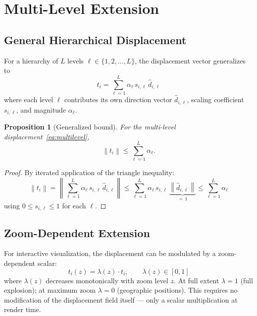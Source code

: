 \documentclass[12pt, a4paper]{article}
\numberwithin{equation}{section}
\theoremstyle{definition}
\theoremstyle{plain}
\newtheorem{proposition}{Proposition}[section]
\theoremstyle{remark}
\newcommand{\norm}[1]{\left\|#1\right\|}
\begin{document}
\section{Multi-Level Extension}
\label{sec:multilevel}

\subsection{General Hierarchical Displacement}

For a hierarchy of $L$ levels $\ell \in \{1, 2, \ldots, L\}$, the displacement vector generalizes to
\begin{equation}
  t_i = \sum_{\ell=1}^{L} \alpha_\ell\, s_{i,\ell}\, \hat{d}_{i,\ell}
  \label{eq:multilevel}
\end{equation}
where each level $\ell$ contributes its own direction vector $\hat{d}_{i,\ell}$, scaling coefficient $s_{i,\ell}$, and magnitude $\alpha_\ell$.

\begin{proposition}[Generalized bound]
\label{prop:gen_bound}
For the multi-level displacement~\eqref{eq:multilevel},
\begin{equation}
  \norm{t_i} \leq \sum_{\ell=1}^{L} \alpha_\ell.
  \label{eq:gen_bound}
\end{equation}
\end{proposition}

\begin{proof}
By iterated application of the triangle inequality:
\[
  \norm{t_i} = \norm{\sum_{\ell=1}^{L} \alpha_\ell\, s_{i,\ell}\, \hat{d}_{i,\ell}}
  \leq \sum_{\ell=1}^{L} \alpha_\ell\, s_{i,\ell}\, \underbrace{\norm{\hat{d}_{i,\ell}}}_{=\,1}
  \leq \sum_{\ell=1}^{L} \alpha_\ell
\]
using $0 \leq s_{i,\ell} \leq 1$ for each $\ell$.
\end{proof}


\subsection{Zoom-Dependent Extension}

For interactive visualization, the displacement can be modulated by a zoom-dependent scalar:
\begin{equation}
  t_i(z) = \lambda(z) \cdot t_i, \qquad \lambda(z) \in [0, 1]
  \label{eq:zoom}
\end{equation}
where $\lambda(z)$ decreases monotonically with zoom level $z$. At full extent $\lambda = 1$ (full explosion); at maximum zoom $\lambda = 0$ (geographic positions). This requires no modification of the displacement field itself --- only a scalar multiplication at render time.
\end{document}
